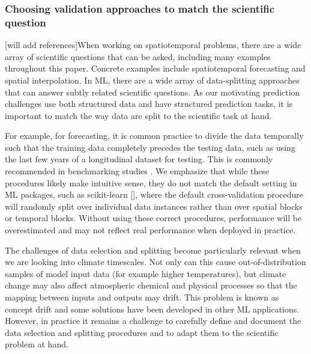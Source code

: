 \documentclass[gmd, manuscript]{copernicus}
\begin{document}
\subsubsection{Choosing validation approaches to match the scientific question}
[will add references]When working on spatiotemporal problems, there are a wide array of scientific questions that can be asked, including many examples throughout this paper. Concrete examples include spatiotemporal forecasting and spatial interpolation. In ML, there are a wide array of data-splitting approaches that can answer subtly related scientific questions. As our motivating prediction challenges use both structured data and have structured prediction tasks, it is important to match the way data are split to the scientific task at hand.
 
For example, for forecasting, it is common practice to divide the data temporally such that the training data completely precedes the testing data, such as using the last few years of a longitudinal dataset for testing. This is commonly recommended in benchmarking studies \citep{lam_learning_2023, Rasp2020}. 
We emphasize that while these procedures likely make intuitive sense, they do not match the default setting in ML packages, such as scikit-learn [], where the default cross-validation procedure will randomly split over individual data instances rather than over spatial blocks or temporal blocks. Without using these correct procedures, performance will be overestimated and may not reflect real performance when deployed in practice. 

The challenges of data selection and splitting become particularly relevant when we are looking into climate timescales. Not only can this cause out-of-distribution samples of model input data (for example higher temperatures), but climate change may also affect atmospheric chemical and physical processes so that the mapping between inputs and outputs may drift. This problem is known as concept drift and some solutions have been developed in other ML applications. However, in practice it remains a challenge to carefully define and document the data selection and splitting procedures and to adapt them to the scientific problem at hand.
\end{document}
